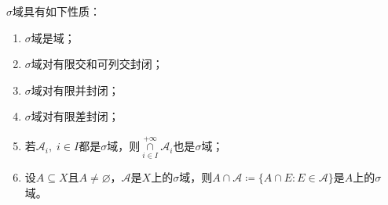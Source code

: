 \begin{property}\label{prop:SigmaField}
	$\sigma$域具有如下性质：
	\begin{enumerate}
		\item $\sigma$域是域；
		\item $\sigma$域对有限交和可列交封闭；
		\item $\sigma$域对有限并封闭；
		\item $\sigma$域对有限差封闭；
		\item 若$\mathscr{A}_i,\;i\in I$都是$\sigma$域，则$\underset{i\in I}{\overset{+\infty}{\cap}}\mathscr{A}_i$也是$\sigma$域；
		\item 设$A\subseteq X$且$A\ne\varnothing$，$\mathscr{A}$是$X$上的$\sigma$域，则$A\cap\mathscr{A}\coloneq\{A\cap E:E\in\mathscr{A}\}$是$A$上的$\sigma$域。
	\end{enumerate}
\end{property}
